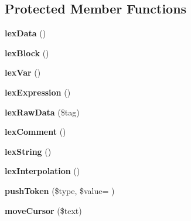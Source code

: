\subsection*{Protected Member Functions}
\begin{DoxyCompactItemize}
\item 
\hypertarget{class_twig___lexer_a2add928259bb030ac402cc33590ba64a}{}{\bfseries lex\+Data} ()\label{class_twig___lexer_a2add928259bb030ac402cc33590ba64a}

\item 
\hypertarget{class_twig___lexer_a30dd86720deb6f2a0e87dbfc48937c57}{}{\bfseries lex\+Block} ()\label{class_twig___lexer_a30dd86720deb6f2a0e87dbfc48937c57}

\item 
\hypertarget{class_twig___lexer_a848a6f31f1b60791ecb8c3193c64c6e0}{}{\bfseries lex\+Var} ()\label{class_twig___lexer_a848a6f31f1b60791ecb8c3193c64c6e0}

\item 
\hypertarget{class_twig___lexer_ac956b3fcfa0824c6a4e45e807c650a9e}{}{\bfseries lex\+Expression} ()\label{class_twig___lexer_ac956b3fcfa0824c6a4e45e807c650a9e}

\item 
\hypertarget{class_twig___lexer_a311224b615ef6c8b3b134a63e7e9d1c3}{}{\bfseries lex\+Raw\+Data} (\$tag)\label{class_twig___lexer_a311224b615ef6c8b3b134a63e7e9d1c3}

\item 
\hypertarget{class_twig___lexer_a83490c3c77d548d2bc407e7a765a6294}{}{\bfseries lex\+Comment} ()\label{class_twig___lexer_a83490c3c77d548d2bc407e7a765a6294}

\item 
\hypertarget{class_twig___lexer_a3ed3bf6449b50d0c0e3695ba465477c3}{}{\bfseries lex\+String} ()\label{class_twig___lexer_a3ed3bf6449b50d0c0e3695ba465477c3}

\item 
\hypertarget{class_twig___lexer_a17e2f99891071f122a720e5067bfd883}{}{\bfseries lex\+Interpolation} ()\label{class_twig___lexer_a17e2f99891071f122a720e5067bfd883}

\item 
\hypertarget{class_twig___lexer_a2a4e2b0b3f1bf74213d5536b6668106d}{}{\bfseries push\+Token} (\$type, \$value= \textquotesingle{}\textquotesingle{})\label{class_twig___lexer_a2a4e2b0b3f1bf74213d5536b6668106d}

\item 
\hypertarget{class_twig___lexer_a5dbd7870991505f65e5cc292a4b30272}{}{\bfseries move\+Cursor} (\$text)\label{class_twig___lexer_a5dbd7870991505f65e5cc292a4b30272}


\end{DoxyCompactItemize}
